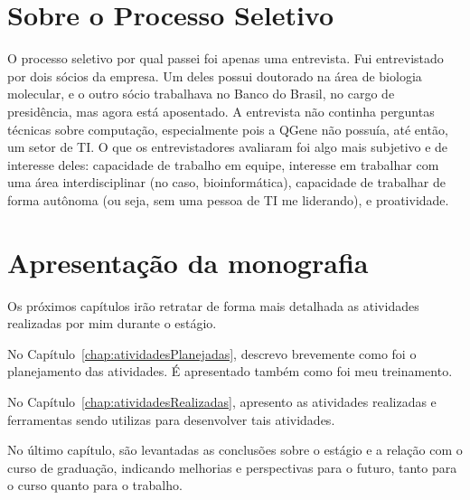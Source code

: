 

\section{Sobre o Processo Seletivo}
O processo seletivo por qual passei foi apenas uma entrevista. Fui entrevistado por dois sócios da empresa. Um deles
possui doutorado na área de biologia molecular, e o outro sócio trabalhava no Banco do Brasil, no cargo de presidência,
mas agora está aposentado. A entrevista não continha perguntas técnicas sobre computação, especialmente pois a QGene não
possuía, até então, um setor de TI. O que os entrevistadores avaliaram foi algo mais subjetivo e de interesse deles:
capacidade de trabalho em equipe, interesse em trabalhar com uma área interdisciplinar (no caso, bioinformática),
capacidade de trabalhar de forma autônoma (ou seja, sem uma pessoa de TI me liderando), e proatividade.


\section{Apresentação da monografia}

Os próximos capítulos irão retratar de forma mais detalhada as atividades realizadas por mim durante o estágio.

No Capítulo~\ref{chap:atividadesPlanejadas}, descrevo brevemente como foi o planejamento das atividades. É apresentado também
como foi meu treinamento.

No Capítulo~\ref{chap:atividadesRealizadas}, apresento as atividades realizadas e ferramentas sendo utilizas para desenvolver tais atividades. 

No último capítulo, são levantadas as conclusões sobre o estágio e a relação com 
o curso de graduação, indicando melhorias e perspectivas para o futuro, tanto para o curso 
quanto para o trabalho.
